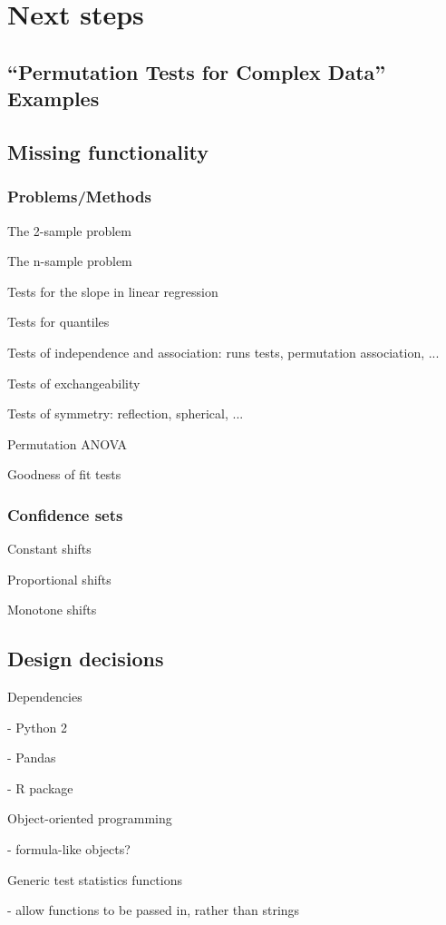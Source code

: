 \chapter{Next steps}

\section{``Permutation Tests for Complex Data'' Examples}

\cite{pesarin2010permutation}

\section{Missing functionality}


\subsection{Problems/Methods}

The 2-sample problem

The n-sample problem

Tests for the slope in linear regression 

Tests for quantiles

Tests of independence and association: runs tests, permutation association, ...

Tests of exchangeability

Tests of symmetry: reflection, spherical, ...

Permutation ANOVA

Goodness of fit tests


\subsection{Confidence sets}

Constant shifts

Proportional shifts

Monotone shifts

\section{Design decisions}

Dependencies

- Python 2

- Pandas

- R package

Object-oriented programming

- formula-like objects?

Generic test statistics functions

- allow functions to be passed in, rather than strings
